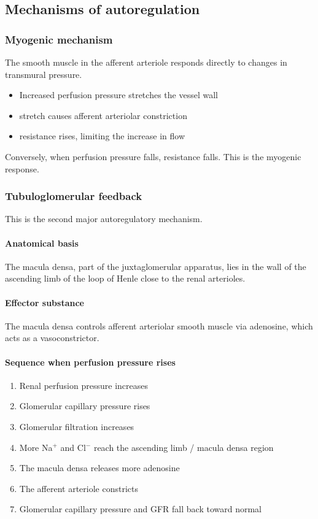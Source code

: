 \documentclass[11pt,a4paper]{article}
\begin{document}
\subsection{Mechanisms of autoregulation}

\subsubsection{Myogenic mechanism}

The smooth muscle in the afferent arteriole responds directly to changes in transmural pressure.
\begin{itemize}
    \item Increased perfusion pressure stretches the vessel wall
    \item stretch causes afferent arteriolar constriction
    \item resistance rises, limiting the increase in flow
\end{itemize}

Conversely, when perfusion pressure falls, resistance falls. This is the myogenic response.

\subsubsection{Tubuloglomerular feedback}

This is the second major autoregulatory mechanism.

\paragraph{Anatomical basis}

The macula densa, part of the juxtaglomerular apparatus, lies in the wall of the ascending limb of the loop of Henle close to the renal arterioles.

\paragraph{Effector substance}

The macula densa controls afferent arteriolar smooth muscle via adenosine, which acts as a vasoconstrictor.

\paragraph{Sequence when perfusion pressure rises}

\begin{enumerate}
    \item Renal perfusion pressure increases
    \item Glomerular capillary pressure rises
    \item Glomerular filtration increases
    \item More Na$^+$ and Cl$^-$ reach the ascending limb / macula densa region
    \item The macula densa releases more adenosine
    \item The afferent arteriole constricts
    \item Glomerular capillary pressure and GFR fall back toward normal
\end{enumerate}
\end{document}
